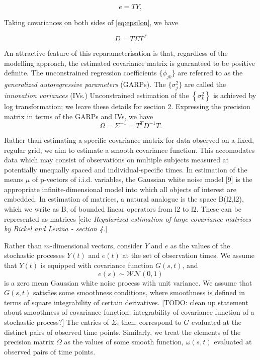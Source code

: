 \documentclass[12pt]{article}
\theoremstyle{definition}
\begin{document}
\begin{equation}
e = T Y, \label{eq:epsilon}
\end{equation}
\noindent

Taking covariances on both sides of \ref{eq:epsilon}, we have

\begin{equation} \label{eq:cholesky_decomp}
D = T \Sigma T^T 
\end{equation} 

An attractive feature of this reparameterisation is that, regardless of the modelling approach, the estimated covariance matrix is guaranteed to be positive definite. The unconstrained regression coefficients $\lbrace \phi_{jk} \rbrace$ are referred to as the \emph{generalized autoregressive parameters} (GARPs). The $\lbrace \sigma^2_{j} \rbrace$ are called the \emph{innovation variances} (IVs.)  Unconstrained estimation of the $\left\{ \sigma_{k}^2 \right\}$ is achieved by log transformation;  we leave these details for section 2. Expressing the precision matrix  in terms of the GARPs and IVs, we have
\begin{equation} \label{eq:omega_decomp}
\Omega= \Sigma^{-1} = T^T D^{-1} T.
\end{equation}

Rather than estimating a specific covariance matrix for data observed on a fixed, regular grid, we aim to estimate a smooth covariance function. This accomodates data which may consist of  observations on multiple subjects measured at potentially unequally spaced and individual-specific times. In estimation of the means $\mu$ of p-vectors of i.i.d. variables, the
Gaussian white noise model [9] is the appropriate infinite-dimensional model into
which all objects of interest are embedded. In estimation of matrices, a natural
analogue is the space B(l2,l2), which we write as B, of bounded linear operators
from l2 to l2. These can be represented as matrices [cite \textit{Regularized estimation of large covariance matrices by Bickel and Levina - section 4.}]

Rather than $m$-dimensional vectors, consider $Y$ and $e$ as the values of the stochastic processes $Y\left(t\right)$ and $e\left(t\right)$ at the set of observation times.  We assume that $Y\left(t\right)$ is equipped with covariance function $G\left(s,t\right)$, and
\[
e\left(s\right) \sim \mathcal{WN}\left(0,1\right)
\] 
is a zero mean Gaussian white noise process with unit variance. We assume that $G\left(s,t\right)$ satisfies some smoothness conditions, where smoothness is defined in terms of square integrability of certain derivatives. [TODO: clean up statement about smoothness of covariance function; integrability of covariance function of a stochastic process?] The entries of $\Sigma$, then, correspond to $G$ evaluated at the distinct pairs of observed time points. Similarly, we treat the elements of the precision matrix $\Omega$ as the values of some smooth function, $\omega\left(s,t\right)$ evaluated at observed pairs of time points.
\end{document}
